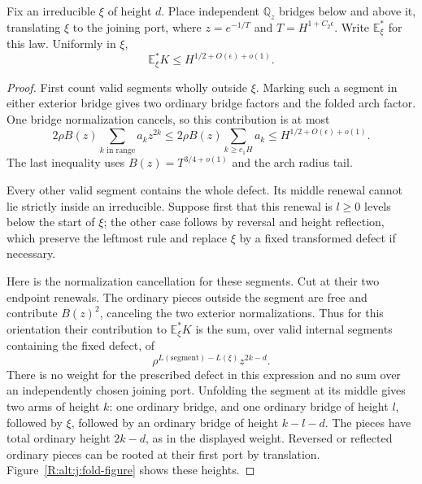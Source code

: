\begin{lemma}\label{R:signed:folding}
Fix an irreducible $\xi$ of height $d$. Place independent
$\mathbb Q_z$ bridges below and above it, translating $\xi$ to the joining
port, where $z=e^{-1/T}$ and $T=H^{1+C_2\epsilon}$. Write $\mathbb E^*_\xi$
for this law. Uniformly in $\xi$,
\begin{equation}\label{R:alt:j:eq-br9}
 \mathbb E^*_\xi K\le H^{1/2+O(\epsilon)+o(1)}.
\end{equation}
\end{lemma}
\begin{proof}
First count valid segments wholly outside $\xi$. Marking such a segment
in either exterior bridge gives two ordinary bridge factors and the folded
arch factor. One bridge normalization cancels, so this contribution is at
most
\[
 2\rho B(z)\sum_{k\text{ in range}}a_kz^{2k}
 \le 2\rho B(z)\sum_{k\ge c_1H}a_k
 \le H^{1/2+O(\epsilon)+o(1)}.
\]
The last inequality uses $B(z)=T^{3/4+o(1)}$ and the arch radius tail.

Every other valid segment contains the whole defect. Its middle renewal
cannot lie strictly inside an irreducible. Suppose first that this renewal
is $l\ge0$ levels below the start of $\xi$; the other case follows by
reversal and height reflection, which preserve the leftmost rule and
replace $\xi$ by a fixed transformed defect if necessary.

Here is the normalization cancellation for these segments. Cut at their
two endpoint renewals. The ordinary pieces outside the segment are free
and contribute $B(z)^2$, canceling the two exterior normalizations. Thus
for this orientation their contribution to $\mathbb E^*_\xi K$ is the sum,
over valid internal segments containing the fixed defect, of
\[
 \rho^{L(\text{segment})-L(\xi)}z^{2k-d}.
\]
There is no weight for the prescribed defect in this expression and no
sum over an independently chosen joining port. Unfolding the segment
at its middle gives two arms of height $k$: one ordinary bridge, and
one ordinary bridge of height $l$, followed by $\xi$, followed by an
ordinary bridge of height $k-l-d$. The pieces have total ordinary height
$2k-d$, as in the displayed weight. Reversed or reflected ordinary pieces
can be rooted at their first port by translation. Figure~\ref{R:alt:j:fold-figure}
shows these heights.


\end{proof}

